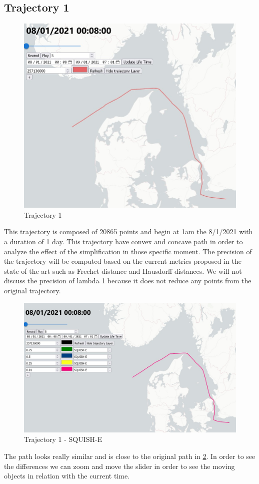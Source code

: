 \subsection{Trajectory 1}

\begin{figure}[!h]
    \centering
    \includegraphics[width=0.5\linewidth]{figures/Stats/traj_1.jpg}
    \caption{Trajectory 1}
    \label{fig:traj_1}
\end{figure}

This trajectory is composed of 20865 points and begin at 1am the 8/1/2021 with a duration of 1 day. This trajectory have convex and concave path in order to analyze the effect of the simplification in those specific moment. The precision of the trajectory will be computed based on the current metrics proposed in the state of the art such as Frechet distance and Hausdorff distances. We will not discuss the precision of lambda 1 because it does not reduce any points from the original trajectory.



\begin{figure}[!h]
    \centering
    \includegraphics[width=0.5\linewidth]{figures/Stats/squish_1.jpg}
    \caption{Trajectory 1 - SQUISH-E}
    \label{fig:traj_1_squish}
\end{figure}

The path looks really similar and is close to the original path in \ref{fig:traj_1_squish}. In order to see the differences we can zoom and move the slider in order to see the moving objects in relation with the current time.

